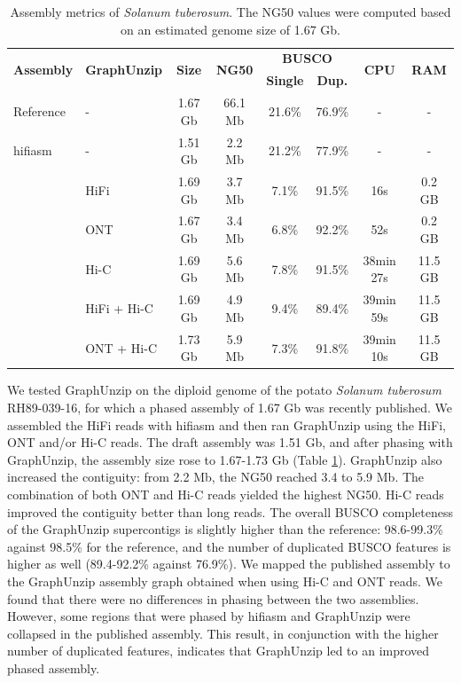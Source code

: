 \begin{table}[ht]
    \begin{center}
    \caption{\label{tab:solanum_tuberosum_assemblies}Assembly metrics of \textit{Solanum tuberosum}. The NG50 values were computed based on an estimated genome size of 1.67 Gb.}
    \begin{tabular}{llcccccc}
        \hline
        \multirow{2}{*}{\textbf{Assembly}} & \multirow{2}{*}{\textbf{GraphUnzip}} & \multirow{2}{*}{\textbf{Size}} & \multirow{2}{*}{\textbf{NG50}} &  \multicolumn{2}{c}{\textbf{BUSCO}} & \multirow{2}{*}{\textbf{CPU}} & \multirow{2}{*}{\textbf{RAM}} \\
        & & & & \textbf{Single} & \textbf{Dup.} & & \\
        \hline
        Reference & - & 1.67 Gb & 66.1 Mb & 21.6\% & 76.9\% & - & - \\
        \hline
        hifiasm & - & 1.51 Gb & 2.2 Mb & 21.2\% & 77.9\% & - & - \\
            & HiFi & 1.69 Gb & 3.7 Mb & 7.1\% & 91.5\% & 16s & 0.2 GB \\
            & ONT & 1.67 Gb & 3.4 Mb & 6.8\% & 92.2\% & 52s & 0.2 GB \\
            & Hi-C & 1.69 Gb & 5.6 Mb & 7.8\% & 91.5\% & 38min 27s & 11.5 GB\\
            & HiFi + Hi-C & 1.69 Gb & 4.9 Mb & 9.4\% & 89.4\% & 39min 59s & 11.5 GB \\
            & ONT + Hi-C & 1.73 Gb & 5.9 Mb & 7.3\% & 91.8\% & 39min 10s & 11.5 GB \\
        \hline
        \end{tabular}
  \end{center}
\end{table}

We tested GraphUnzip on the diploid genome of the potato \textit{Solanum tuberosum} RH89-039-16, for which a phased assembly of 1.67 Gb \cite{potato} was recently published. We assembled the HiFi reads with hifiasm and then ran GraphUnzip using the HiFi, ONT and/or Hi-C reads. The draft assembly was 1.51 Gb, and after phasing with GraphUnzip, the assembly size rose to 1.67-1.73 Gb (Table \ref{tab:solanum_tuberosum_assemblies}). GraphUnzip also increased the contiguity: from 2.2 Mb, the NG50 reached 3.4 to 5.9 Mb. The combination of both ONT and Hi-C reads yielded the highest NG50. Hi-C reads improved the contiguity better than long reads. The overall BUSCO completeness of the GraphUnzip supercontigs is slightly higher than the reference: 98.6-99.3\% against 98.5\% for the reference, and the number of duplicated BUSCO features is higher as well (89.4-92.2\% against 76.9\%). We mapped the published assembly to the GraphUnzip assembly graph obtained when using Hi-C and ONT reads. We found that there were no differences in phasing between the two assemblies. However, some regions that were phased by hifiasm and GraphUnzip were collapsed in the published assembly. This result, in conjunction with the higher number of duplicated features, indicates that GraphUnzip led to an improved phased assembly. \\

